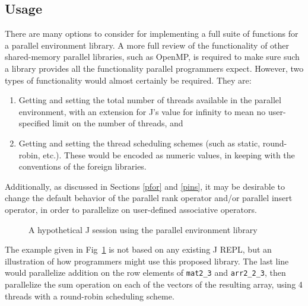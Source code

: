\subsection{Usage}
There are many options to consider for implementing a full suite of functions for a parallel environment library.
A more full review of the functionality of other shared-memory parallel libraries, such as OpenMP\cite{openmp}, 
is required to make sure such a library provides all the functionality parallel programmers expect.
However, two types of functionality would almost certainly be required.
They are:

\begin{enumerate}
    \item Getting and setting the total number of threads available in the parallel environment,
        with an extension for J's value for infinity to mean no user-specified limit on the number of threads, and
    \item Getting and setting the thread scheduling schemes (such as static, round-robin, etc.).
        These would be encoded as numeric values, in keeping with the conventions of the foreign libraries.
\end{enumerate}

\noindent Additionally, as discussed in Sections \ref{pfor} and \ref{pins}, it may be desirable to change 
the default behavior of the parallel rank operator and/or parallel insert operator, 
in order to parallelize on user-defined associative operators.

\begin{figure}[h]
\begin{quote}
\begin{singlespacing}
\begin{small}
\end{small}
\end{singlespacing}
\end{quote}
\caption{A hypothetical J session using the parallel environment library}
\label{fig::pfor}
\end{figure}

The example given in Fig~\ref{fig::pfor} is not based on any existing J REPL, 
but an illustration of how programmers might use this proposed library.
The last line would parallelize addition on the row elements of \texttt{mat2\_3} and \texttt{arr2\_2\_3},
then parallelize the sum operation on each of the vectors of the resulting array, 
using 4 threads with a round-robin scheduling scheme.
